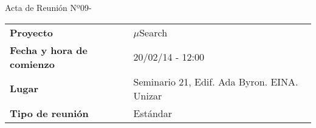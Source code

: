 \begin{center}	
\Large{Acta de Reunión Nº09\hspace{0.25em}-\hspace{0.25em}\tituloReunion}
\end{center}
\vspace{1.5em}

\begin{longtable}{ | L{\tabcolsep} |
				     L{\tabcolsep} | }
\hline %
  \\
\hline %
{\bf Proyecto} & $\mu$Search \\ 
\hline %
{\bf Fecha y hora de comienzo} & 20/02/14 - 12:00 \\
\hline %
{\bf Lugar} & Seminario 21, Edif. Ada Byron. EINA. Unizar \\
\hline %
{\bf Tipo de reunión} & Estándar \\
\hline %
\end{longtable}


